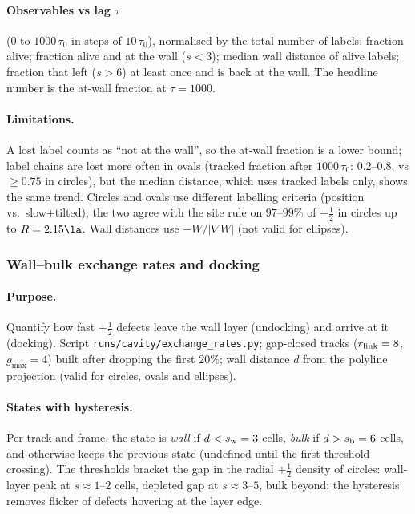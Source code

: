 \paragraph{Observables vs lag $\tau$} ($0$ to $1000\,\tau_0$ in steps of $10\,\tau_0$), normalised by the total number of labels:
fraction alive; fraction alive and at the wall ($s<3$); median wall distance of alive labels; fraction that left ($s>6$) at least once and
is back at the wall. The headline number is the at-wall fraction at $\tau=1000$.

\paragraph{Limitations.} A lost label counts as ``not at the wall'', so the at-wall fraction is a lower bound; label chains are lost more
often in ovals (tracked fraction after $1000\,\tau_0$: $0.2$--$0.8$, vs $\ge0.75$ in circles), but the median distance, which uses tracked
labels only, shows the same trend. Circles and ovals use different labelling criteria (position vs.\ slow+tilted); the two agree with the
site rule on $97$--$99\%$ of $+\tfrac12$ in circles up to $R=2.15\la$. Wall distances use $-W/|\nabla W|$ (not valid for ellipses).

\subsubsection{Wall--bulk exchange rates and docking}
\label{sec:md-exchange}

\paragraph{Purpose.} Quantify how fast $+\tfrac12$ defects leave the wall layer (undocking) and arrive at it (docking). Script
\texttt{runs/cavity/exchange\_rates.py}; gap-closed tracks ($r_{\rm link}=8$, $g_{\max}=4$) built after dropping the first $20\%$; wall
distance $d$ from the polyline projection (valid for circles, ovals and ellipses).

\paragraph{States with hysteresis.} Per track and frame, the state is \emph{wall} if $d<s_{\rm w}=3$ cells, \emph{bulk} if $d>s_{\rm b}=6$
cells, and otherwise keeps the previous state (undefined until the first threshold crossing). The thresholds bracket the gap in the radial
$+\tfrac12$ density of circles: wall-layer peak at $s\approx1$--$2$ cells, depleted gap at $s\approx3$--$5$, bulk beyond; the hysteresis
removes flicker of defects hovering at the layer edge.

